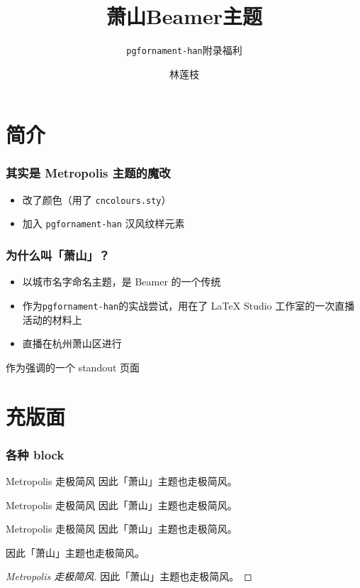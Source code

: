 \documentclass[linespread=1.2,aspectratio=1610]{ctexbeamer}
\author{林莲枝}
\title{萧山Beamer主题}
\subtitle{\texttt{pgfornament-han}附录福利}
\begin{document}
\begin{frame}
  \maketitle
\end{frame}

\section{简介}

\begin{frame}
  \frametitle{其实是 Metropolis 主题的魔改}
  \begin{itemize}
    \item 改了颜色（用了 \texttt{cncolours.sty}）
    \item 加入 \texttt{pgfornament-han} 汉风纹样元素
  \end{itemize}
\end{frame}

\begin{frame}
  \frametitle{为什么叫「萧山」？}
  \begin{itemize}
    \item 以城市名字命名主题，是 Beamer 的一个传统
    \item 作为\texttt{pgfornament-han}的实战尝试，用在了 \LaTeX{} Studio 工作室的一次直播活动的材料上
    \item 直播在{\kaishu 杭州萧山区}进行
  \end{itemize}
\end{frame}

\begin{frame}[standout]
作为强调的一个 standout 页面
\end{frame}

\section{充版面}

\begin{frame}[allowframebreaks]
  \frametitle{各种 block}

  \begin{block}{Metropolis 走极简风}
    因此「萧山」主题也走极简风。
  \end{block}

  \begin{exampleblock}{Metropolis 走极简风}
    因此「萧山」主题也走极简风。
  \end{exampleblock}

  \begin{alertblock}{Metropolis 走极简风}
    因此「萧山」主题也走极简风。
  \end{alertblock}

  \begin{theorem}
    因此「萧山」主题也走极简风。
  \end{theorem}

  \begin{proof}[Metropolis 走极简风]
    因此「萧山」主题也走极简风。
  \end{proof}
\end{frame}
\end{document}
